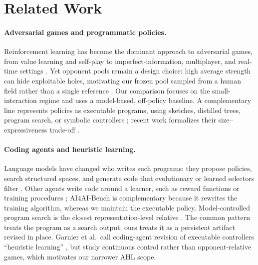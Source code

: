 \section{Related Work}

\paragraph{Adversarial games and programmatic policies.}
Reinforcement learning has become the dominant approach to adversarial games, from
value learning and self-play to imperfect-information, multiplayer, and real-time
settings \citep{dqn2015,alphago2016,alphagozero2017,alphazero2018,muzero2020,
cfr2007,deepstack2017,libratus2018,pluribus2019,alphastar2019,openaifive2019}.
Yet opponent pools remain a design choice: high average strength can hide exploitable
holes, motivating our frozen pool sampled from a human field rather than a single
reference \citep{psro2017,adversarialgo2023,asro2026coevolution,adversarialheuristics2026}.
Our comparison focuses on the small-interaction regime and uses a model-based,
off-policy baseline. A complementary line represents policies as executable programs,
using sketches, distilled trees, program search, or symbolic controllers
\citep{pirl2018,viper2018,inductivegen2020,leaps2021,symbolicpolicies2021}; recent work
formalizes their size--expressiveness trade-off \citep{programmaticrl2024foundations}.

\paragraph{Coding agents and heuristic learning.}
Language models have changed who writes such programs: they propose policies, search
structured spaces, and generate code that evolutionary or learned selectors filter
\citep{llmguidedsearch2024,qube2024,hsevo2024,diprl2026,prorl2026,teacherawareheuristic2026}.
Other agents write code around a learner, such as reward functions or training
procedures \citep{eureka2023,rewarddesignagent2026,agent2rlbench2026,ai4aibench2026};
AI4AI-Bench is complementary because it rewrites the training algorithm, whereas we
maintain the executable policy. Model-controlled program search is the closest
representation-level relative \citep{codetoplay2024,kuang2025generative}. The common
pattern treats the program as a search output; ours treats it as a persistent artifact
revised in place. Garnier et al.~call coding-agent revision of executable controllers
``heuristic learning'' \citep{garnier2026heuristic}, but study continuous control rather
than opponent-relative games, which motivates our narrower AHL scope.

